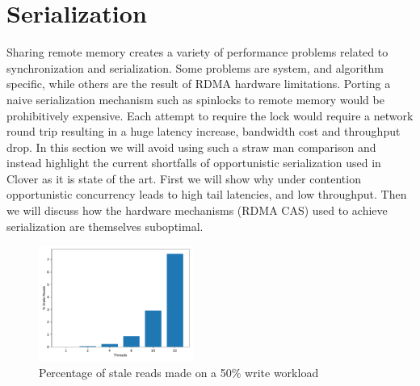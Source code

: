 \section{Serialization}



Sharing remote memory creates a variety of performance problems related to
synchronization and serialization. Some problems are system, and algorithm
specific, while others are the result of RDMA hardware limitations.  Porting a
naive serialization mechanism such as spinlocks to remote memory would be
prohibitively expensive. Each attempt to require the lock would require a
network round trip resulting in a huge latency increase, bandwidth cost and
throughput drop. In this section we will avoid using such a straw man comparison
and instead highlight the current shortfalls of opportunistic serialization used
in Clover as it is state of the art. First we will show why under contention
opportunistic concurrency leads to high tail latencies, and low throughput. Then
we will discuss how the hardware mechanisms (RDMA CAS) used to achieve
serialization are themselves suboptimal.


\begin{figure}[t]
    \includegraphics[width=0.45\textwidth]{fig/stale_reads.pdf}
    \caption{Percentage of stale reads made on a 50\% write workload }
    \label{fig:stale_reads}
\end{figure}

